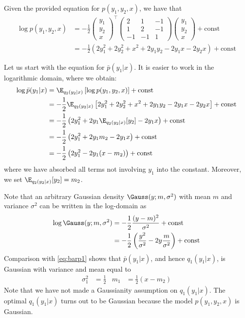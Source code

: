 \begin{exenumerate}
\begin{solution}
    Given the provided equation for $p(y_1, y_2, x)$, we have that
    \begin{align}
      \log p(y_1, y_2, x) & = -\frac{1}{2} \begin{pmatrix}
        y_1\\
        y_2\\
        x
      \end{pmatrix}^\top
      \begin{pmatrix}
        2 & 1 & -1\\
        1 & 2 & -1\\
        -1 & -1 & 1
      \end{pmatrix}
      \begin{pmatrix}
        y_1\\
        y_2\\
        x
      \end{pmatrix} + \text{const}\\
        & = -\frac{1}{2} \left( 2 y_1^2 + 2 y_2^2 + x^2 + 2 y_1 y_2 - 2 y_1 x - 2y_2 x \right) + \text{const}
    \end{align}
    
    Let us start with the equation for $\bar{p}(y_1|x)$. It is easier to work in the logarithmic domain, where we obtain:
    \begin{align}
      \log  \bar{p}(y_1|x) & =  \E_{q_2(y_2|x)}\left[ \log p(y_1, y_2, x)\right] + \text{const}\\
      & = -\frac{1}{2} \E_{q_2(y_2|x)}\left[  2 y_1^2 + 2 y_2^2 + x^2 + 2 y_1 y_2 - 2 y_1 x - 2y_2 x \right] + \text{const}\\
      & = -\frac{1}{2} \left(2 y_1^2 + 2 y_1 \E_{q_2(y_2|x)}[y_2] - 2 y_1 x \right) + \text{const}\\
      & = -\frac{1}{2} \left( 2 y_1^2 +2y_1 m_2 - 2 y_1 x \right) + \text{const}\\
      & = -\frac{1}{2} \left( 2 y_1^2 - 2 y_1 (x-m_2) \right) + \text{const}
      \label{eq:barp1}
    \end{align}
    where we have absorbed all terms not involving $y_1$ into the constant. Moreover, we set $\E_{q_2(y_2|x)}[y_2]=m_2$.

    Note that an arbitrary Gaussian density $\Gauss(y; m, \sigma^2)$
    with mean $m$ and variance $\sigma^2$ can be written in the
    log-domain as
    \begin{align}
      \log \Gauss(y; m, \sigma^2) & = -\frac{1}{2}\frac{(y-m)^2}{\sigma^2} + \text{const}\\
      & = -\frac{1}{2} \left( \frac{y^2}{\sigma^2} -2y \frac{m}{\sigma^2} \right) + \text{const}
      \label{eq:loggauss}
    \end{align}
    Comparison with \eqref{eq:barp1} shows that $\bar{p}(y_1|x)$, and
    hence $q_1(y_1 | x)$, is Gaussian with variance and mean equal to
    \begin{align}
      \sigma_1^2 &= \frac{1}{2} & m_1 & = \frac{1}{2}(x-m_2)
    \end{align}
    Note that we have not made a Gaussianity assumption on $q_1(y_1 |
    x)$. The optimal $q_1(y_1 | x)$ turns out to be Gaussian because
    the model $p(y_1, y_2, x)$ is Gaussian.
    

\end{solution}
\end{exenumerate}
